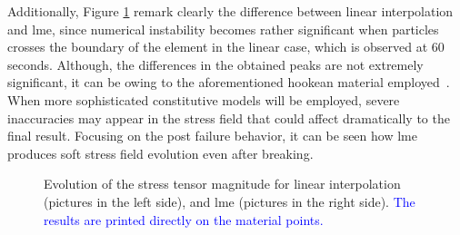 \documentclass[preprint,12pt,a4paper]{elsarticle}
\begin{document}
Additionally, Figure \ref{fig:Stress-cracked-panel-mode-I}
remark clearly the difference between linear interpolation and
\acrshort{lme}, since numerical instability becomes rather significant
when particles crosses the boundary of the element in the linear
case, which is observed at 60 seconds. Although, the differences in the obtained peaks are not extremely significant, it
can be owing to the aforementioned hookean material
employed~\cite{Zhang_EE_2020}. When more sophisticated constitutive
models will be employed, severe inaccuracies may appear in the
stress field that could affect dramatically to the final 
result. Focusing on the post failure behavior, it can be seen how
\acrshort{lme} produces soft stress field evolution even after
breaking. 
\begin{figure}
\centering
{}
\caption{Evolution of the stress tensor magnitude for linear
  interpolation (pictures in the left side), and \acrshort{lme}
  (pictures in the right side).  \textcolor{blue}{The results are printed directly on the material points.}}
\label{fig:Stress-cracked-panel-mode-I}
\end{figure}
\end{document}
